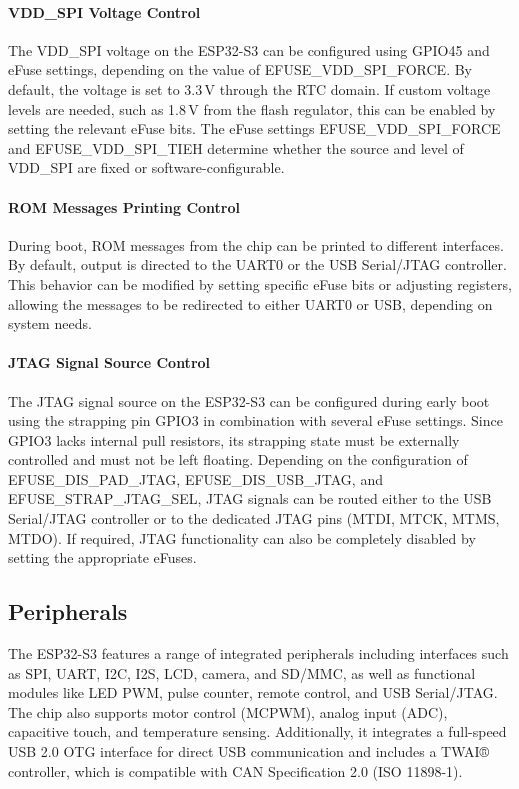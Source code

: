 \paragraph{VDD\_SPI Voltage Control} The VDD\_SPI voltage on the ESP32-S3 can be configured using GPIO45 and eFuse settings, depending on the value of EFUSE\_VDD\_SPI\_FORCE. By default, the voltage is set to 3.3\,V through the RTC domain. If custom voltage levels are needed, such as 1.8\,V from the flash regulator, this can be enabled by setting the relevant eFuse bits. The eFuse settings EFUSE\_VDD\_SPI\_FORCE and EFUSE\_VDD\_SPI\_TIEH determine whether the source and level of VDD\_SPI are fixed or software-configurable.

\paragraph{ROM Messages Printing Control} During boot, ROM messages from the chip can be printed to different interfaces. By default, output is directed to the UART0 or the USB Serial/JTAG controller. This behavior can be modified by setting specific eFuse bits or adjusting registers, allowing the messages to be redirected to either UART0 or USB, depending on system needs.

\paragraph{JTAG Signal Source Control} The JTAG signal source on the ESP32-S3 can be configured during early boot using the strapping pin GPIO3 in combination with several eFuse settings. Since GPIO3 lacks internal pull resistors, its strapping state must be externally controlled and must not be left floating. Depending on the configuration of EFUSE\_DIS\_PAD\_JTAG, EFUSE\_DIS\_USB\_JTAG, and EFUSE\_STRAP\_JTAG\_SEL, JTAG signals can be routed either to the USB Serial/JTAG controller or to the dedicated JTAG pins (MTDI, MTCK, MTMS, MTDO). If required, JTAG functionality can also be completely disabled by setting the appropriate eFuses.

\subsection{Peripherals}
The ESP32-S3 features a range of integrated peripherals including interfaces such as SPI, UART, I2C, I2S, LCD, camera, and SD/MMC, as well as functional modules like LED PWM, pulse counter, remote control, and USB Serial/JTAG. The chip also supports motor control (MCPWM), analog input (ADC), capacitive touch, and temperature sensing. Additionally, it integrates a full-speed USB 2.0 OTG interface for direct USB communication and includes a TWAI® controller, which is compatible with CAN Specification 2.0 (ISO 11898-1).

